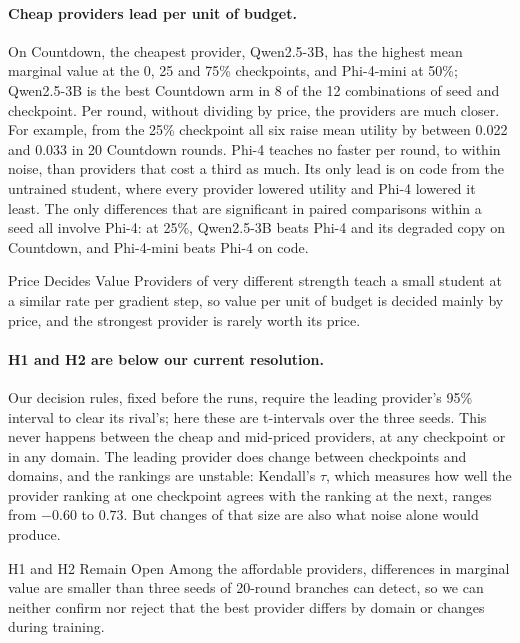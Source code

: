 \paragraph{Cheap providers lead per unit of budget.} On Countdown, the cheapest provider,
Qwen2.5-3B, has the highest mean marginal value at the 0, 25 and 75\% checkpoints, and
Phi-4-mini at 50\%; Qwen2.5-3B is the best Countdown arm in 8 of the 12 combinations of seed
and checkpoint. Per round, without dividing by price, the providers are much closer. For
example, from the 25\% checkpoint all six raise mean utility by between 0.022 and 0.033 in
20 Countdown rounds. Phi-4 teaches no faster per round, to within noise, than providers that
cost a third as much. Its only lead is on code from the untrained student, where every
provider lowered utility and Phi-4 lowered it least. The only differences that are
significant in paired comparisons within a seed all involve Phi-4: at 25\%, Qwen2.5-3B beats
Phi-4 and its degraded copy on Countdown, and Phi-4-mini beats Phi-4 on code.

\begin{takeaway}{Price Decides Value}
\label{ca:tk:price}
Providers of very different strength teach a small student at a similar rate per gradient
step, so value per unit of budget is decided mainly by price, and the strongest provider is
rarely worth its price.
\end{takeaway}

\paragraph{H1 and H2 are below our current resolution.} Our decision rules, fixed before the
runs, require the leading provider's 95\% interval to clear its rival's; here these are
t-intervals over the three seeds. This never happens between the cheap and mid-priced
providers, at any checkpoint or in any domain. The leading provider does change between
checkpoints and domains, and the rankings are unstable: Kendall's $\tau$, which measures how
well the provider ranking at one checkpoint agrees with the ranking at the next, ranges from
$-0.60$ to $0.73$. But changes of that size are also what noise alone would produce.

\begin{takeaway}{H1 and H2 Remain Open}
\label{ca:tk:open}
Among the affordable providers, differences in marginal value are smaller than three seeds
of 20-round branches can detect, so we can neither confirm nor reject that the best
provider differs by domain or changes during training.
\end{takeaway}

